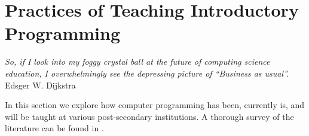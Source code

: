 \label{chapter:problem}

\section{Practices of Teaching Introductory Programming}

\begin{flushright}
\textit{So, if I look into my foggy crystal ball at the future of computing science education, I overwhelmingly see the depressing picture of ``Business as usual''.}
\\
Edsger W. Dijkstra \cite{Dijkstra89} \\
\end{flushright}

In this section we explore how computer programming has been, currently is, and will be taught at various post-secondary institutions.  A thorough survey of the literature can be found in \cite{Pears07}.

